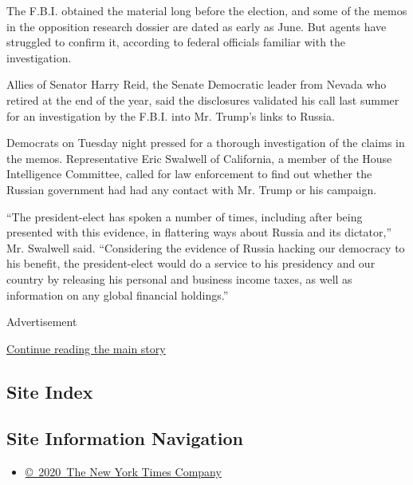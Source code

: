 The F.B.I. obtained the material long before the election, and some of
the memos in the opposition research dossier are dated as early as June.
But agents have struggled to confirm it, according to federal officials
familiar with the investigation.

Allies of Senator Harry Reid, the Senate Democratic leader from Nevada
who retired at the end of the year, said the disclosures validated his
call last summer for an investigation by the F.B.I. into Mr. Trump's
links to Russia.

Democrats on Tuesday night pressed for a thorough investigation of the
claims in the memos. Representative Eric Swalwell of California, a
member of the House Intelligence Committee, called for law enforcement
to find out whether the Russian government had had any contact with Mr.
Trump or his campaign.

``The president-elect has spoken a number of times, including after
being presented with this evidence, in flattering ways about Russia and
its dictator,'' Mr. Swalwell said. ``Considering the evidence of Russia
hacking our democracy to his benefit, the president-elect would do a
service to his presidency and our country by releasing his personal and
business income taxes, as well as information on any global financial
holdings.''

Advertisement

\protect\hyperlink{after-bottom}{Continue reading the main story}

\hypertarget{site-index}{%
\subsection{Site Index}\label{site-index}}

\hypertarget{site-information-navigation}{%
\subsection{Site Information
Navigation}\label{site-information-navigation}}

\begin{itemize}
\tightlist
\item
  \href{https://help.nytimes.com/hc/en-us/articles/115014792127-Copyright-notice}{©~2020~The
  New York Times Company}
\end{itemize}


